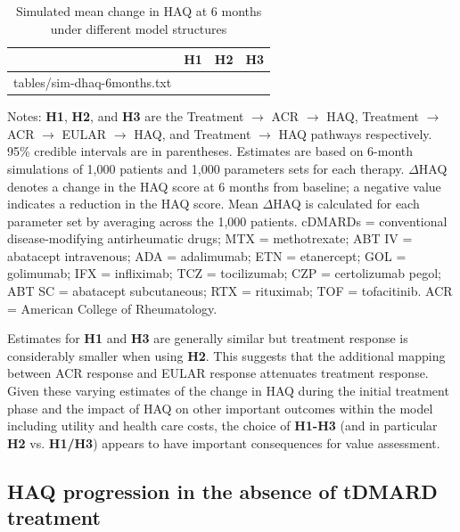 \documentclass[11pt,final,fleqn]{article}\usepackage[]{graphicx}\usepackage[]{color}
\makeatletter
\theoremstyle{plain}
\newcommand*\ExpandableInput[1]{\@@input#1 }
\makeatother
\begin{document}
\begin{table}[!ht]
\begin{center}
\begin{threeparttable}
\caption{Simulated mean change in HAQ at 6 months under different model structures} \label{tbl:sim-haq-change}
\begin{tabularx}{\textwidth}{@{\extracolsep{\fill}}lccc}
\hline
\multicolumn{1}{l}{} & \multicolumn{1}{c}{\textbf{H1}} & \multicolumn{1}{c}{\textbf{H2}} & \multicolumn{1}{c}{\textbf{H3}} \\
\hline
\ExpandableInput{tables/sim-dhaq-6months.txt}
\hline
\end{tabularx}
\scriptsize
Notes: \textbf{H1}, \textbf{H2}, and \textbf{H3} are the Treatment $\rightarrow$ ACR $\rightarrow$ HAQ, Treatment $\rightarrow$ ACR $\rightarrow$ EULAR $\rightarrow$ HAQ, and Treatment $\rightarrow$ HAQ pathways respectively. 95\% credible intervals are in parentheses. Estimates are based on 6-month simulations of 1,000 patients and 1,000 parameters sets for each therapy. $\Delta$HAQ denotes a change in the HAQ score at 6 months from baseline; a negative value indicates a reduction in the HAQ score. Mean $\Delta$HAQ is calculated for each parameter set by averaging across the 1,000 patients. cDMARDs = conventional disease-modifying antirheumatic drugs; MTX = methotrexate; ABT IV = abatacept intravenous; ADA = adalimumab; ETN = etanercept; GOL = golimumab; IFX = infliximab; TCZ = tocilizumab; CZP = certolizumab pegol; ABT SC = abatacept subcutaneous; RTX = rituximab; TOF = tofacitinib. ACR = American College of Rheumatology. 
\end{threeparttable}
\end{center}
\end{table}

Estimates for \textbf{H1} and \textbf{H3} are generally similar but treatment response is considerably smaller when using \textbf{H2}. This suggests that the additional mapping between ACR response and EULAR response attenuates treatment response. Given these varying estimates of the change in HAQ during the initial treatment phase and the impact of HAQ on other important outcomes within the model including utility and health care costs, the choice of \textbf{H1-H3} (and in particular \textbf{H2} vs. \textbf{H1/H3}) appears to have important consequences for value assessment.  

\subsection{HAQ progression in the absence of tDMARD treatment}\label{haq-progression-in-the-absence-of-tDMARD-treatment}
\end{document}
